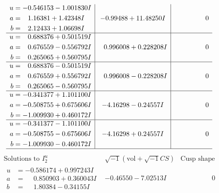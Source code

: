 \documentclass[1p]{elsarticle_modified}
\theoremstyle{definition}
\newcommand{\I}{\sqrt{-1}}
\begin{document}
$$\begin{array}{c|c|c}
\begin{aligned}
u &= -0.546153 - 1.001830 I \\
a &= \phantom{-}1.16381 + 1.42348 I \\
b &= \phantom{-}2.12433 + 1.06698 I\end{aligned}
 & -0.99488 + 11.48250 I & \phantom{-0.000000 } 0 \\ \hline\begin{aligned}
u &= \phantom{-}0.688376 + 0.501519 I \\
a &= \phantom{-}0.676559 - 0.556792 I \\
b &= \phantom{-}0.265065 + 0.560795 I\end{aligned}
 & \phantom{-}0.996008 + 0.228208 I & \phantom{-0.000000 } 0 \\ \hline\begin{aligned}
u &= \phantom{-}0.688376 - 0.501519 I \\
a &= \phantom{-}0.676559 + 0.556792 I \\
b &= \phantom{-}0.265065 - 0.560795 I\end{aligned}
 & \phantom{-}0.996008 - 0.228208 I & \phantom{-0.000000 } 0 \\ \hline\begin{aligned}
u &= -0.341377 + 1.101100 I \\
a &= -0.508755 + 0.675606 I \\
b &= -1.009930 + 0.460172 I\end{aligned}
 & -4.16298 - 0.24557 I & \phantom{-0.000000 } 0 \\ \hline\begin{aligned}
u &= -0.341377 - 1.101100 I \\
a &= -0.508755 - 0.675606 I \\
b &= -1.009930 - 0.460172 I\end{aligned}
 & -4.16298 + 0.24557 I & \phantom{-0.000000 } 0\\
 \hline 
 \end{array}$$\newpage$$\begin{array}{c|c|c}  
\text{Solutions to }I^u_{2}& \I (\text{vol} + \sqrt{-1}CS) & \text{Cusp shape}\\
 \hline 
\begin{aligned}
u &= -0.586174 + 0.997243 I \\
a &= \phantom{-}0.850903 + 0.360043 I \\
b &= \phantom{-}1.80384 - 0.34155 I\end{aligned}
 & -0.46550 - 7.02513 I & \phantom{-0.000000 } 0 \\ \hline\begin{aligned}

\end{aligned}
\end{array}$$
\end{document}
